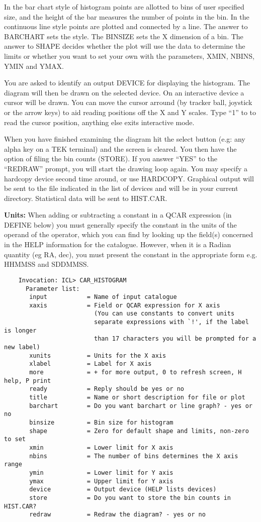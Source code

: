In the bar chart style of histogram points are allotted to bins
of user specified size, and the height of the bar measures the
number of points in the bin.
In the continuous line style points are plotted and connected by a
line.
The answer to BARCHART sets the style.
The BINSIZE sets the X dimension of a bin.
The answer to SHAPE decides whether the plot will use the data to
determine the limits or whether you want to set your own with the
parameters, XMIN, NBINS, YMIN and YMAX.

You are asked to identify an output DEVICE for displaying the
histogram.
The diagram will then be drawn on the selected device.
On an interactive device a cursor will be drawn.
You can move the cursor arround (by tracker ball, joystick or the arrow
keys) to aid reading positions off the X and Y scales.
Type ``1'' to to read the cursor position, anything else exits
interactive mode.

When you have finished examining the diagram hit the select button
(e.g: any alpha key on a TEK terminal) and the screen is cleared.
You then have the option of filing the bin counts (STORE).
If you answer ``YES'' to the ``REDRAW'' prompt, you will start the
drawing loop again.
You may specify a hardcopy device second time around, or use HARDCOPY.
Graphical output will be sent to the file indicated in the list of
devices and will be in your current directory.
Statistical data will be sent to HIST.CAR.

{\bf Units:} When adding or subtracting a constant in a QCAR expression (in
DEFINE below) you must generally specify the constant in the units of the
operand of the operator, which you can find by looking up the field(s) concerned
in the HELP information for the catalogue.
However, when it is a Radian quantity (eg RA, dec), you must present the
constant in the appropriate form e.g. HHMMSS and SDDMMSS.
\begin{verbatim}
    Invocation: ICL> CAR_HISTOGRAM
      Parameter list:
       input           = Name of input catalogue
       xaxis           = Field or QCAR expression for X axis
                         (You can use constants to convert units
                         separate expressions with `!', if the label is longer
                         than 17 characters you will be prompted for a new label)
       xunits          = Units for the X axis
       xlabel          = Label for X axis
       more            = + for more output, 0 to refresh screen, H help, P print
       ready           = Reply should be yes or no
       title           = Name or short description for file or plot
       barchart        = Do you want barchart or line graph? - yes or no
       binsize         = Bin size for histogram
       shape           = Zero for default shape and limits, non-zero to set
       xmin            = Lower limit for X axis
       nbins           = The number of bins determines the X axis range
       ymin            = Lower limit for Y axis
       ymax            = Upper limit for Y axis
       device          = Output device (HELP lists devices)
       store           = Do you want to store the bin counts in HIST.CAR?
       redraw          = Redraw the diagram? - yes or no
\end{verbatim}

